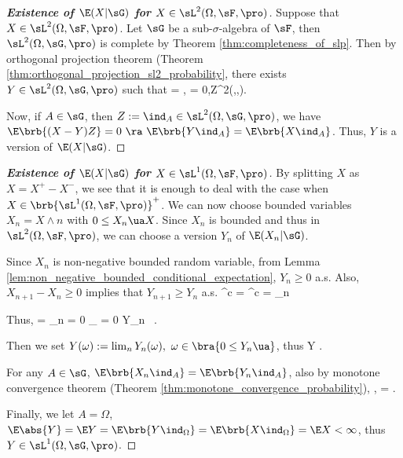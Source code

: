 \begin{proof}[\bf Existence of $\E(X|\sG)$ for $X\in \sL^2(\Omega,\sF,\pro)$]
Suppose that $X\in \sL^2(\Omega,\sF,\pro)$. Let $\sG$ be a sub-$\sigma$-algebra of $\sF$, then $\sL^2(\Omega,\sG,\pro)$ is complete by Theorem \ref{thm:completeness_of_slp}. Then by orthogonal projection theorem (Theorem \ref{thm:orthogonal_projection_sl2_probability}, there exists $Y\in \sL^2(\Omega,\sG,\pro)$ such that
\be
\E{} = \inf {},\quad \quad {} = 0,\quad Z\in \sL^2(\Omega,\sG,\pro).
\ee

Now, if $A\in \sG$, then $Z:=\ind_A\in \sL^2(\Omega,\sG,\pro)$, we have $\E\brb{(X-Y)Z} = 0\ \ra\ \E\brb{Y\ind_A} = \E\brb{X\ind_A}$. Thus, $Y$ is a version of $\E(X|\sG)$.
\end{proof}


\begin{proof}[\bf Existence of $\E(X|\sG)$ for $X\in \sL^1(\Omega,\sF,\pro)$]
By splitting $X$ as $X=X^+ - X^-$, we see that it is enough to deal with the case when $X\in \brb{\sL^1(\Omega,\sF,\pro)}^+$. We can now choose bounded variables $X_n = X\land n$ with $0\leq X_n \ua X$. Since $X_n$ is bounded and thus in $\sL^2(\Omega,\sF,\pro)$, we can choose a version $Y_n$ of $\E(X_n|\sG)$.

Since $X_n$ is non-negative bounded random variable, from Lemma \ref{lem:non_negative_bounded_conditional_expectation}, $Y_n \geq 0$ a.s. Also, $X_{n+1} - X_n \geq 0$ implies that $Y_{n+1} \geq Y_n$ a.s.
\be
{}^c = ^c = \bigcup_n 
\ee

Thus,
\be
\pro{} = \pro{} \leq \sum_n \pro {} = 0 \cdot \underbrace{\infty}_{} = 0 \quad\ra{}\leq Y_n \ua \ .
\ee

Then we set $Y(\omega) := \lim_n Y_n(\omega),\ \omega \in \bra{0\leq Y_n \ua}$, thus
\be
Y .
\ee

For any $A \in \sG$, $\E\brb{X_n\ind_A} = \E\brb{Y_n\ind_A}$, also by monotone convergence theorem (Theorem \ref{thm:monotone_convergence_probability}),
\be
\E{} \to \E{},\quad\quad \E{} \to \E{}\quad\ra\quad \E{} = \E{}.
\ee

Finally, we let $A = \Omega$, $\E\abs{Y} = \E Y = \E\brb{Y \ind_\Omega} = \E\brb{X \ind_\Omega} = \E X < \infty$, thus $Y \in \sL^1(\Omega,\sG,\pro)$.
\end{proof}

